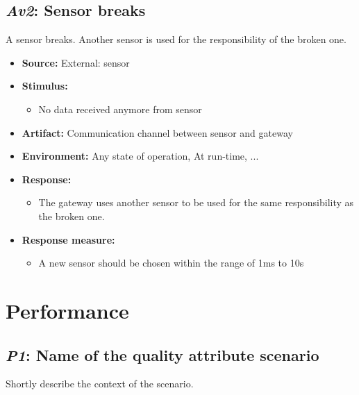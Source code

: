 \documentclass[english]{sareport}
\begin{document}
\subsection{\emph{Av2}: Sensor breaks}
A sensor breaks. Another sensor is used for the responsibility of the broken one.

\begin{itemize}
    \item \textbf{Source:} External: sensor
    \item \textbf{Stimulus:}
        \begin{itemize}
            \item No data received anymore from sensor
        \end{itemize}

    \item \textbf{Artifact:} Communication channel between sensor and gateway
    \item \textbf{Environment:} Any state of operation, At run-time, ...
    \item \textbf{Response:}
        \begin{itemize}
            \item The gateway uses another sensor to be used for the same responsibility as the broken one.
        \end{itemize}

    \item \textbf{Response measure:}
        \begin{itemize}
            \item A new sensor should be chosen within the range of 1ms to 10s %
        \end{itemize}
\end{itemize}

\section{Performance}
\subsection{\emph{P1}: Name of the quality attribute scenario}
Shortly describe the context of the scenario.
\end{document}

